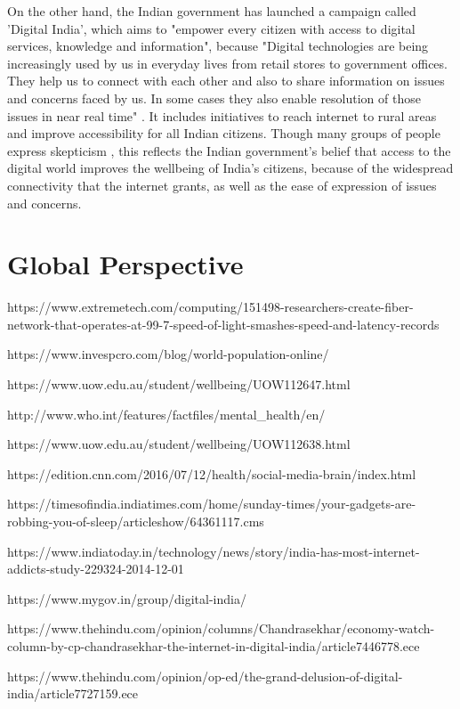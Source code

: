 \documentclass[a4paper, 11pt]{article}
\begin{document}
On the other hand, the Indian government has launched a campaign called 'Digital India', which aims to "empower every citizen with access to digital services, knowledge and information", because "Digital technologies are being increasingly used by us in everyday lives from retail stores to government offices. They help us to connect with each other and also to share information on issues and concerns faced by us. In some cases they also enable resolution of those issues in near real time" \cite{digital-india-gov}. It includes initiatives to reach internet to rural areas and improve accessibility for all Indian citizens. Though many groups of people express skepticism \cite{digital-india-thehindu, digital-india-thehindu-2}, this reflects the Indian government's belief that access to the digital world improves the wellbeing of India's citizens, because of the widespread connectivity that the internet grants, as well as the ease of expression of issues and concerns.

\section{Global Perspective}



\begin{thebibliography}{X}

  https://www.extremetech.com/computing/151498-researchers-create-fiber-network-that-operates-at-99-7-speed-of-light-smashes-speed-and-latency-records

  https://www.invespcro.com/blog/world-population-online/

  https://www.uow.edu.au/student/wellbeing/UOW112647.html

  http://www.who.int/features/factfiles/mental\_health/en/

  https://www.uow.edu.au/student/wellbeing/UOW112638.html

  https://edition.cnn.com/2016/07/12/health/social-media-brain/index.html

  https://timesofindia.indiatimes.com/home/sunday-times/your-gadgets-are-robbing-you-of-sleep/articleshow/64361117.cms

  https://www.indiatoday.in/technology/news/story/india-has-most-internet-addicts-study-229324-2014-12-01

  https://www.mygov.in/group/digital-india/

  https://www.thehindu.com/opinion/columns/Chandrasekhar/economy-watch-column-by-cp-chandrasekhar-the-internet-in-digital-india/article7446778.ece

  https://www.thehindu.com/opinion/op-ed/the-grand-delusion-of-digital-india/article7727159.ece

\end{thebibliography}
\end{document}
